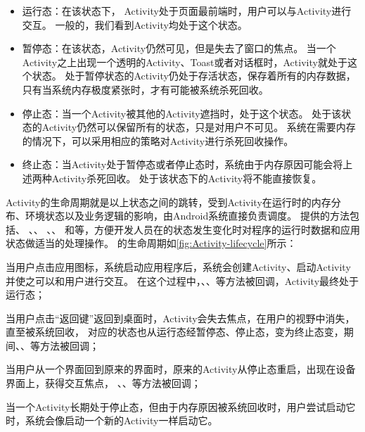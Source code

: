 \begin{itemize}
		\setlength{\itemsep}{-5pt}
		
	\item 运行态：在该状态下， Activity处于页面最前端时，用户可以与Activity进行交互。
	一般的，我们看到Activity均处于这个状态。
	
	\item 暂停态：在该状态，Activity仍然可见，但是失去了窗口的焦点。
	当一个Activity之上出现一个透明的Activity、Toast或者对话框时，Activity就处于这个状态。
	处于暂停状态的Activity仍处于存活状态，保存着所有的内存数据，只有当系统内存极度紧张时，才有可能被系统杀死回收。
	
	\item 停止态：当一个Activity被其他的Activity遮挡时，处于这个状态。
	处于该状态的Activity仍然可以保留所有的状态，只是对用户不可见。
	系统在需要内存的情况下，可以采用相应的策略对Activity进行杀死回收操作。
	
	\item 终止态：当Activity处于暂停态或者停止态时，系统由于内存原因可能会将上述两种Activity杀死回收。
	处于该状态下的Activity将不能直接恢复。
\end{itemize}


Activity的生命周期就是以上状态之间的跳转，受到Activity在运行时的内存分布、环境状态以及业务逻辑的影响，由Android系统直接负责调度。
提供的方法包括、 、、 、、 和等，方便开发人员在的状态发生变化时对程序的运行时数据和应用状态做适当的处理操作。
的生命周期如\autoref{fig:Activity-lifecycle}所示：



当用户点击应用图标，系统启动应用程序后，系统会创建Activity、启动Activity并使之可以和用户进行交互。
在这个过程中，、、等方法被回调，Activity最终处于运行态；

当用户点击“返回键”返回到桌面时，Activity会失去焦点，在用户的视野中消失，直至被系统回收，
对应的状态也从运行态经暂停态、停止态，变为终止态变，期间、、等方法被回调；

当用户从一个界面回到原来的界面时，原来的Activity从停止态重启，出现在设备界面上，获得交互焦点，
、、等方法被回调；

当一个Activity长期处于停止态，但由于内存原因被系统回收时，用户尝试启动它时，系统会像启动一个新的Activity一样启动它。

